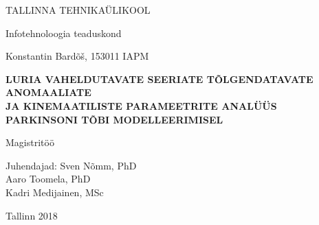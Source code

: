 \begin{titlepage}
    \begin{center}
        \large
        TALLINNA TEHNIKAÜLIKOOL
        
        Infotehnoloogia teaduskond
        
        \vspace*{6.5cm}
        
        
         Konstantin Bardõš, 153011 IAPM
        
        \vspace{0.3cm}
        
        \Large
        
        
        
        

        \textbf{LURIA VAHELDUTAVATE SEERIATE TÕLGENDATAVATE ANOMAALIATE \\ JA KINEMAATILISTE PARAMEETRITE ANALÜÜS PARKINSONI TÕBI  MODELLEERIMISEL}
        
        
        
        \large
        \vspace{0.3cm}
        Magistritöö
        
        \vspace{2cm}
        
        \begin{flushright}
        Juhendajad: Sven Nõmm, PhD \\ Aaro Toomela, PhD \\ Kadri Medijainen, MSc
        \end{flushright}
        
        
        \vfill
        

        \vspace{0.8cm}
        
        Tallinn 
        2018
        
    \end{center}
\end{titlepage}